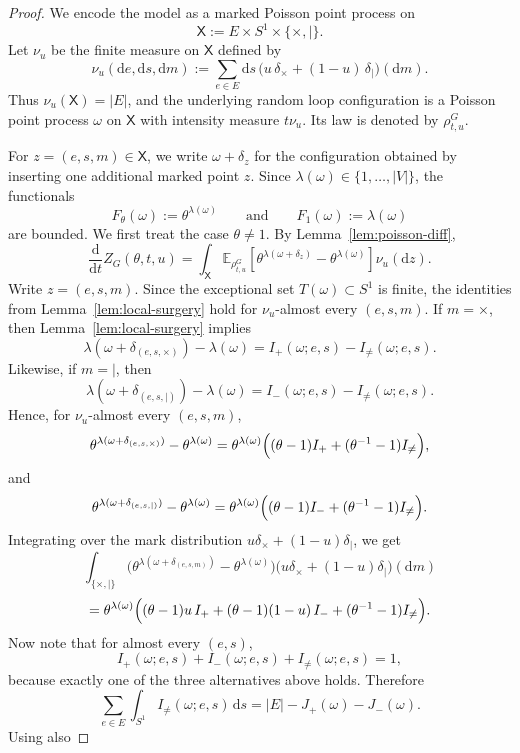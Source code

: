 \documentclass[11pt]{article}
\theoremstyle{remark}
\theoremstyle{plain}
\newcommand{\Ebb}{\mathbb{E}}
\newcommand{\1}{\mathbbm{1}}
\newcommand{\dd}{\mathrm{d}}
\begin{document}
\begin{proof}
We encode the model as a marked Poisson point process on
\[
\mathsf X:=E\times S^1\times\{\times,\mid\}.
\]
Let \(\nu_u\) be the finite measure on \(\mathsf X\) defined by
\[
\nu_u(\dd e,\dd s,\dd m)
:=
\sum_{e\in E}\dd s\,
\bigl(u\,\delta_{\times}+(1-u)\,\delta_{\mid}\bigr)(\dd m).
\]
Thus \(\nu_u(\mathsf X)=|E|\), and the underlying random loop configuration is a
Poisson point process \(\omega\) on \(\mathsf X\) with intensity measure \(t\nu_u\).
Its law is denoted by \(\rho_{t,u}^G\).

For \(z=(e,s,m)\in\mathsf X\), we write \(\omega+\delta_z\) for the configuration
obtained by inserting one additional marked point \(z\). Since
\(\lambda(\omega)\in\{1,\dots,|V|\}\), the functionals
\[
F_\theta(\omega):=\theta^{\lambda(\omega)}
\qquad\text{and}\qquad
F_1(\omega):=\lambda(\omega)
\]
are bounded.
We first treat the case \(\theta\neq 1\). By Lemma~\ref{lem:poisson-diff},
\[
\frac{\dd}{\dd t}Z_G(\theta,t,u)
=
\int_{\mathsf X}
\Ebb_{\rho_{t,u}^G}\!\left[
\theta^{\lambda(\omega+\delta_z)}-\theta^{\lambda(\omega)}
\right]\nu_u(\dd z).
\]
Write \(z=(e,s,m)\). Since the exceptional set \(T(\omega)\subset S^1\) is finite,
the identities from Lemma~\ref{lem:local-surgery} hold for \(\nu_u\)-almost every
\((e,s,m)\).
If \(m=\times\), then Lemma~\ref{lem:local-surgery} implies
\[
\lambda(\omega+\delta_{(e,s,\times)})-\lambda(\omega)
=
I_+(\omega;e,s)-I_{\neq}(\omega;e,s).
\]
Likewise, if \(m=\mid\), then
\[
\lambda(\omega+\delta_{(e,s,\mid)})-\lambda(\omega)
=
I_-(\omega;e,s)-I_{\neq}(\omega;e,s).
\]
Hence, for \(\nu_u\)-almost every \((e,s,m)\),
\[
\theta^{\lambda(\omega+\delta_{(e,s,\times)})}-\theta^{\lambda(\omega)}
=
\theta^{\lambda(\omega)}
\Bigl((\theta-1)I_+ + (\theta^{-1}-1)I_{\neq}\Bigr),
\]
and
\[
\theta^{\lambda(\omega+\delta_{(e,s,\mid)})}-\theta^{\lambda(\omega)}
=
\theta^{\lambda(\omega)}
\Bigl((\theta-1)I_- + (\theta^{-1}-1)I_{\neq}\Bigr).
\]
Integrating over the mark distribution
\(u\delta_\times+(1-u)\delta_{\mid}\), we get
\[
\int_{\{\times,\mid\}}
\bigl(\theta^{\lambda(\omega+\delta_{(e,s,m)})}-\theta^{\lambda(\omega)}\bigr)
\bigl(u\delta_\times+(1-u)\delta_{\mid}\bigr)(\dd m)
\]
\[
=
\theta^{\lambda(\omega)}
\Bigl(
(\theta-1)u\,I_+ + (\theta-1)(1-u)\,I_- + (\theta^{-1}-1)I_{\neq}
\Bigr).
\]
Now note that for almost every \((e,s)\),
\[
I_+(\omega;e,s)+I_-(\omega;e,s)+I_{\neq}(\omega;e,s)=1,
\]
because exactly one of the three alternatives above holds. Therefore
\[
\sum_{e\in E}\int_{S^1} I_{\neq}(\omega;e,s)\,\dd s
=
|E|-J_+(\omega)-J_-(\omega).
\]
Using also

\end{proof}
\end{document}
